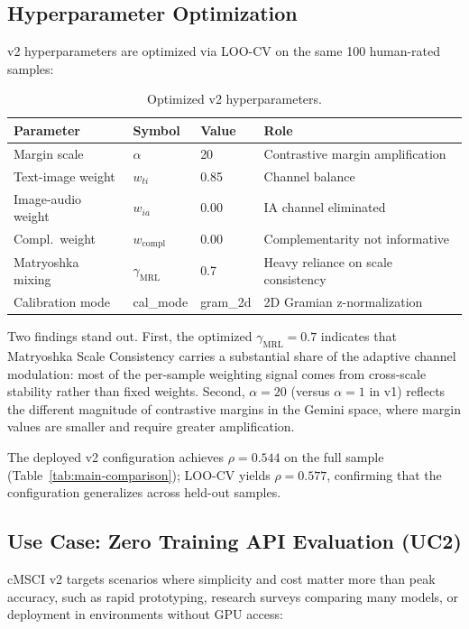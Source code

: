 \documentclass[a4paper,fleqn]{cas-sc}
\begin{document}
\begin{itemize}
\subsection{Hyperparameter Optimization}\label{sec:v2-hyperparams}

v2 hyperparameters are optimized via LOO-CV on the same 100 human-rated samples:

\begin{table}[t]
\caption{Optimized v2 hyperparameters.}\label{tab:v2-hyperparams}
\centering
\begin{tabular}{llll}
\toprule
Parameter & Symbol & Value & Role \\
\midrule
Margin scale & $\alpha$ & 20 & Contrastive margin amplification \\
Text-image weight & $w_{ti}$ & 0.85 & Channel balance \\
Image-audio weight & $w_{ia}$ & 0.00 & IA channel eliminated \\
Compl.\ weight & $w_{\mathrm{compl}}$ & 0.00 & Complementarity not informative \\
Matryoshka mixing & $\gamma_{\mathrm{MRL}}$ & 0.7 & Heavy reliance on scale consistency \\
Calibration mode & cal\_mode & gram\_2d & 2D Gramian z-normalization \\
\bottomrule
\end{tabular}
\end{table}

Two findings stand out. First, the optimized $\gamma_{\mathrm{MRL}} = 0.7$ indicates that Matryoshka Scale Consistency carries a substantial share of the adaptive channel modulation: most of the per-sample weighting signal comes from cross-scale stability rather than fixed weights. Second, $\alpha = 20$ (versus $\alpha = 1$ in v1) reflects the different magnitude of contrastive margins in the Gemini space, where margin values are smaller and require greater amplification.

The deployed v2 configuration achieves $\rho = 0.544$ on the full sample (Table~\ref{tab:main-comparison}); LOO-CV yields $\rho = 0.577$, confirming that the configuration generalizes across held-out samples.

\subsection{Use Case: Zero Training API Evaluation (UC2)}\label{sec:uc2}

cMSCI v2 targets scenarios where simplicity and cost matter more than peak accuracy, such as rapid prototyping, research surveys comparing many models, or deployment in environments without GPU access:


\end{itemize}
\end{document}
